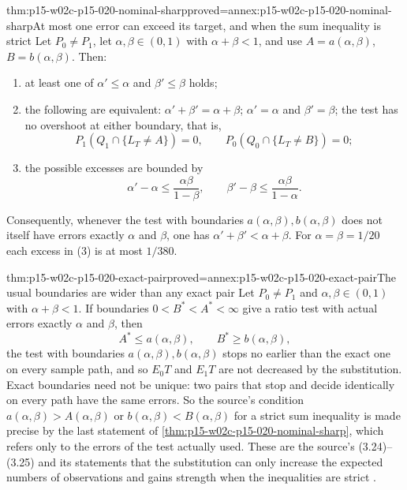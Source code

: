 \begin{hbtheorem}{thm:p15-w02c-p15-020-nominal-sharp}{proved=annex:p15-w02c-p15-020-nominal-sharp}{At most one error can exceed its target, and when the sum inequality is strict}
Let \(P_0\neq P_1\), let \(\alpha,\beta\in(0,1)\) with
\(\alpha+\beta<1\), and use \(A=a(\alpha,\beta)\),
\(B=b(\alpha,\beta)\). Then:
\begin{enumerate}
\item at least one of \(\alpha'\leq\alpha\) and \(\beta'\leq\beta\)
 holds;
\item the following are equivalent:
 \(\alpha'+\beta'=\alpha+\beta\); \(\alpha'=\alpha\) and
 \(\beta'=\beta\); the test has no overshoot at either boundary, that
 is,
 \[
  P_1(Q_1\cap\{L_T\neq A\})=0,\qquad P_0(Q_0\cap\{L_T\neq B\})=0;
 \]
\item the possible excesses are bounded by
 \[
  \alpha'-\alpha\leq\frac{\alpha\beta}{1-\beta},\qquad
  \beta'-\beta\leq\frac{\alpha\beta}{1-\alpha}.
 \]
\end{enumerate}
Consequently, whenever the test with boundaries
\(a(\alpha,\beta),b(\alpha,\beta)\) does not itself have errors exactly
\(\alpha\) and \(\beta\), one has \(\alpha'+\beta'<\alpha+\beta\).
For \(\alpha=\beta=1/20\) each excess in (3) is at most \(1/380\).
\end{hbtheorem}

\begin{hbtheorem}{thm:p15-w02c-p15-020-exact-pair}{proved=annex:p15-w02c-p15-020-exact-pair}{The usual boundaries are wider than any exact pair}
Let \(P_0\neq P_1\) and \(\alpha,\beta\in(0,1)\) with
\(\alpha+\beta<1\). If boundaries \(0<B^*<A^*<\infty\) give a ratio
test with actual errors exactly \(\alpha\) and \(\beta\), then
\[
 A^*\leq a(\alpha,\beta),\qquad B^*\geq b(\alpha,\beta),
\]
the test with boundaries \(a(\alpha,\beta),b(\alpha,\beta)\) stops no
earlier than the exact one on every sample path, and so
\(E_0T\) and \(E_1T\) are not decreased by the substitution.
Exact boundaries need not be unique: two pairs that stop and decide
identically on every path have the same errors. So the source's
condition \(a(\alpha,\beta)>A(\alpha,\beta)\) or
\(b(\alpha,\beta)<B(\alpha,\beta)\) for a strict sum inequality is
made precise by the last statement of
\cref{thm:p15-w02c-p15-020-nominal-sharp}, which refers only to the
errors of the test actually used.
These are the source's (3.24)--(3.25) and its statements that the
substitution can only increase the expected numbers of observations and
gains strength when the inequalities are strict
\cite[Section 3.3, pp.~131 and 133; Section 4.3, p.~146]{Wald1945SequentialTests}.
\end{hbtheorem}

